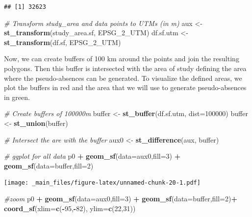 \documentclass[
]{book}
\newenvironment{Shaded}{\begin{snugshade}}{\end{snugshade}}
\newcommand{\AttributeTok}[1]{\textcolor[rgb]{0.13,0.29,0.53}{#1}}
\newcommand{\CommentTok}[1]{\textcolor[rgb]{0.56,0.35,0.01}{\textit{#1}}}
\newcommand{\DecValTok}[1]{\textcolor[rgb]{0.00,0.00,0.81}{#1}}
\newcommand{\FunctionTok}[1]{\textcolor[rgb]{0.13,0.29,0.53}{\textbf{#1}}}
\newcommand{\NormalTok}[1]{#1}
\newcommand{\OtherTok}[1]{\textcolor[rgb]{0.56,0.35,0.01}{#1}}
\newcommand{\SpecialCharTok}[1]{\textcolor[rgb]{0.81,0.36,0.00}{\textbf{#1}}}
\begin{document}
\begin{verbatim}
## [1] 32623
\end{verbatim}

\begin{Shaded}
\begin{Highlighting}[]
\CommentTok{\# Transform study\_area and data points to UTMs (in m)}
\NormalTok{aux }\OtherTok{\textless{}{-}} \FunctionTok{st\_transform}\NormalTok{(study\_area.sf, EPSG\_2\_UTM)}
\NormalTok{df.sf.utm }\OtherTok{\textless{}{-}} \FunctionTok{st\_transform}\NormalTok{(df.sf, EPSG\_2\_UTM)}
\end{Highlighting}
\end{Shaded}

Now, we can create buffers of 100 km around the points and join the resulting polygons. Then this buffer is intersected with the area of study defining the area where the pseudo-absences can be generated. To visualize the defined areas, we plot the buffers in red and the area that we will use to generate pseudo-absences in green.

\begin{Shaded}
\begin{Highlighting}[]
\CommentTok{\# Create buffers of 100000m}
\NormalTok{buffer }\OtherTok{\textless{}{-}} \FunctionTok{st\_buffer}\NormalTok{(df.sf.utm, }\AttributeTok{dist=}\DecValTok{100000}\NormalTok{)}
\NormalTok{buffer }\OtherTok{\textless{}{-}} \FunctionTok{st\_union}\NormalTok{(buffer)}

\CommentTok{\# Intersect the are with the buffer}
\NormalTok{aux0 }\OtherTok{\textless{}{-}} \FunctionTok{st\_difference}\NormalTok{(aux, buffer)}

\CommentTok{\# ggplot for all data}
\NormalTok{p0 }\SpecialCharTok{+}
  \FunctionTok{geom\_sf}\NormalTok{(}\AttributeTok{data=}\NormalTok{aux0,}\AttributeTok{fill=}\DecValTok{3}\NormalTok{) }\SpecialCharTok{+}
  \FunctionTok{geom\_sf}\NormalTok{(}\AttributeTok{data=}\NormalTok{buffer,}\AttributeTok{fill=}\DecValTok{2}\NormalTok{)}
\end{Highlighting}
\end{Shaded}

\texttt{[image: \_main\_files/figure-latex/unnamed-chunk-20-1.pdf]}

\begin{Shaded}
\begin{Highlighting}[]
\CommentTok{\#zoom}
\NormalTok{p0 }\SpecialCharTok{+}
  \FunctionTok{geom\_sf}\NormalTok{(}\AttributeTok{data=}\NormalTok{aux0,}\AttributeTok{fill=}\DecValTok{3}\NormalTok{) }\SpecialCharTok{+}
  \FunctionTok{geom\_sf}\NormalTok{(}\AttributeTok{data=}\NormalTok{buffer,}\AttributeTok{fill=}\DecValTok{2}\NormalTok{)}\SpecialCharTok{+}
  \FunctionTok{coord\_sf}\NormalTok{(}\AttributeTok{xlim=}\FunctionTok{c}\NormalTok{(}\SpecialCharTok{{-}}\DecValTok{95}\NormalTok{,}\SpecialCharTok{{-}}\DecValTok{82}\NormalTok{), }\AttributeTok{ylim=}\FunctionTok{c}\NormalTok{(}\DecValTok{22}\NormalTok{,}\DecValTok{31}\NormalTok{))}
\end{Highlighting}
\end{Shaded}
\end{document}
